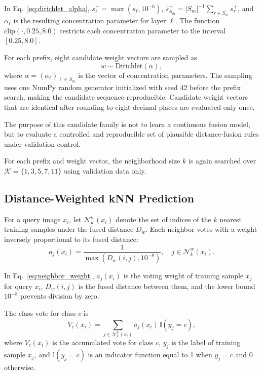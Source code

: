\documentclass[main.tex]{subfiles}
\begin{document}
In Eq.~\eqref{eq:dirichlet_alpha}, \(s_{\ell}^{+}=\max(s_{\ell},10^{-6})\), \(\bar{s}_{S_m}^{+}=|S_m|^{-1}\sum_{r\in S_m}s_r^{+}\), and \(\alpha_{\ell}\) is the resulting concentration parameter for layer \(\ell\). The function \(\mathrm{clip}(\cdot,0.25,8.0)\) restricts each concentration parameter to the interval \([0.25,8.0]\).

For each prefix, eight candidate weight vectors are sampled as
\begin{equation}
  w \sim \mathrm{Dirichlet}(\alpha),
  \label{eq:dirichlet_weights}
\end{equation}
where \(\alpha = (\alpha_{\ell})_{\ell\in S_m}\) is the vector of concentration parameters. The sampling uses one NumPy random generator initialized with seed 42 before the prefix search, making the candidate sequence reproducible. Candidate weight vectors that are identical after rounding to eight decimal places are evaluated only once.

The purpose of this candidate family is not to learn a continuous fusion model, but to evaluate a controlled and reproducible set of plausible distance-fusion rules under validation control.

For each prefix and weight vector, the neighborhood size \(k\) is again searched over \(\mathcal{K}=\{1,3,5,7,11\}\) using validation data only.

\subsection{Distance-Weighted kNN Prediction}

For a query image \(x_i\), let \(\mathcal{N}_{k}^{w}(x_i)\) denote the set of indices of the \(k\) nearest training samples under the fused distance \(D_w\). Each neighbor votes with a weight inversely proportional to its fused distance:
\begin{equation}
  a_j(x_i)
  =
  \frac{1}{\max(D_w(i,j),10^{-8})},
  \quad
  j\in\mathcal{N}_{k}^{w}(x_i).
  \label{eq:neighbor_weight}
\end{equation}

In Eq.~\eqref{eq:neighbor_weight}, \(a_j(x_i)\) is the voting weight of training sample \(x_j\) for query \(x_i\), \(D_w(i,j)\) is the fused distance between them, and the lower bound \(10^{-8}\) prevents division by zero.

The class vote for class \(c\) is
\begin{equation}
  V_c(x_i)
  =
  \sum_{j\in\mathcal{N}_{k}^{w}(x_i)}
  a_j(x_i)\,
  \mathbb{I}(y_j=c),
  \label{eq:class_vote}
\end{equation}
where \(V_c(x_i)\) is the accumulated vote for class \(c\), \(y_j\) is the label of training sample \(x_j\), and \(\mathbb{I}(y_j=c)\) is an indicator function equal to 1 when \(y_j=c\) and 0 otherwise.
\end{document}
